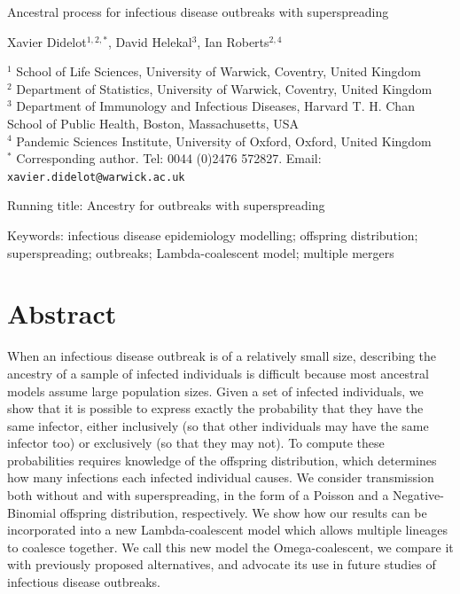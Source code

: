 \documentclass{article}
\begin{document}
{\Large Ancestral process for infectious disease outbreaks with superspreading}


\vspace*{2cm}
Xavier Didelot$^{1,2,*}$, David Helekal$^{3}$, Ian Roberts$^{2,4}$

\vspace*{2cm}
$^1$ School of Life Sciences, University of Warwick, Coventry, United Kingdom\\
$^2$ Department of Statistics, University of Warwick, Coventry, United Kingdom\\
$^3$ Department of Immunology and Infectious Diseases, Harvard T. H. Chan School of Public Health, Boston, Massachusetts, USA\\
$^4$ Pandemic Sciences Institute, University of Oxford, Oxford, United Kingdom\\
$^*$ Corresponding author. Tel: 0044 (0)2476 572827. Email: \verb+xavier.didelot@warwick.ac.uk+

\vspace*{2cm}
Running title: Ancestry for outbreaks with superspreading

\vspace*{2cm}
Keywords: infectious disease epidemiology modelling; offspring distribution; superspreading; outbreaks; Lambda-coalescent model; multiple mergers

\newpage
\section*{Abstract}

When an infectious disease outbreak is of a relatively small size, describing the ancestry
of a sample of infected individuals is difficult because most ancestral models assume
large population sizes. Given a set of infected individuals, 
we show that it is possible to express exactly
the probability that they have the same infector, either inclusively
(so that other individuals may have the same infector too) or exclusively 
(so that they may not).
To compute these probabilities requires knowledge of the offspring distribution, 
which determines how many infections each infected individual causes. 
We consider transmission both without and with superspreading, in the form of a 
Poisson and a Negative-Binomial offspring distribution, respectively. 
We show how our results can be incorporated into a new Lambda-coalescent model
which allows multiple lineages to coalesce together. 
We call this new model the Omega-coalescent, we compare it
with previously proposed alternatives, and advocate its use
in future studies of infectious disease outbreaks.
\end{document}
